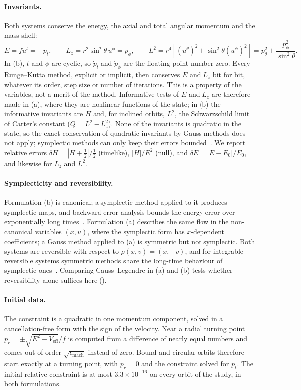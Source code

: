 \paragraph{Invariants.} Both systems conserve the energy, the axial and total angular momentum
and the mass shell:
\begin{equation}
  E = f u^t = -p_t, \qquad L_z = r^2\sin^2\theta\,u^\phi = p_\phi, \qquad
  L^2 = r^4\left[(u^\theta)^2 + \sin^2\theta(u^\phi)^2\right]
      = p_\theta^2 + \frac{p_\phi^2}{\sin^2\theta}.
  \label{eq:invariants}
\end{equation}
In (b), $t$ and $\phi$ are cyclic, so $\dot p_t$ and $\dot p_\phi$ are the floating-point
number zero. Every Runge--Kutta method, explicit or implicit, then conserves $E$ and $L_z$ bit
for bit, whatever its order, step size or number of iterations. This is a property of the
variables, not a merit of the method. Informative tests of $E$ and $L_z$ are therefore made in
(a), where they are nonlinear functions of the state; in (b) the informative invariants are
$H$ and, for inclined orbits, $L^2$, the Schwarzschild limit of Carter's constant
($Q = L^2 - L_z^2$). None of the invariants is quadratic in the state, so the exact
conservation of quadratic invariants by Gauss methods does not apply; symplectic methods can
only keep their errors bounded~\cite{gni2006}. We report relative errors $\delta H =
|H + \tfrac12|/\tfrac12$ (timelike), $|H|/E^2$ (null), and $\delta E = |E - E_0|/E_0$, and
likewise for $L_z$ and $L^2$.

\paragraph{Symplecticity and reversibility.} Formulation (b) is canonical; a symplectic method
applied to it produces symplectic maps, and backward error analysis bounds the energy error
over exponentially long times~\cite{gni2006}. Formulation (a) describes the same flow in the
non-canonical variables $(x, u)$, where the symplectic form has $x$-dependent coefficients; a
Gauss method applied to (a) is symmetric but not symplectic. Both systems are reversible with
respect to $\rho(x, v) = (x, -v)$, and for integrable reversible systems symmetric methods
share the long-time behaviour of symplectic ones~\cite[Ch.~XI]{gni2006}. Comparing
Gauss--Legendre in (a) and (b) tests whether reversibility alone suffices here ().

\paragraph{Initial data.} The constraint is a quadratic in one momentum component, solved in
a cancellation-free form with the sign of the velocity. Near a radial turning point
$p_r = \pm\sqrt{E^2 - V_\mathrm{eff}}/f$ is computed from a difference of nearly equal numbers
and comes out of order $\sqrt{\epsilon_\mathrm{mach}}$ instead of zero. Bound and circular
orbits therefore start exactly at a turning point, with $p_r = 0$ and the constraint solved
for $p_t$. The initial relative constraint is at most $3.3\times10^{-16}$ on every orbit of
the study, in both formulations.
